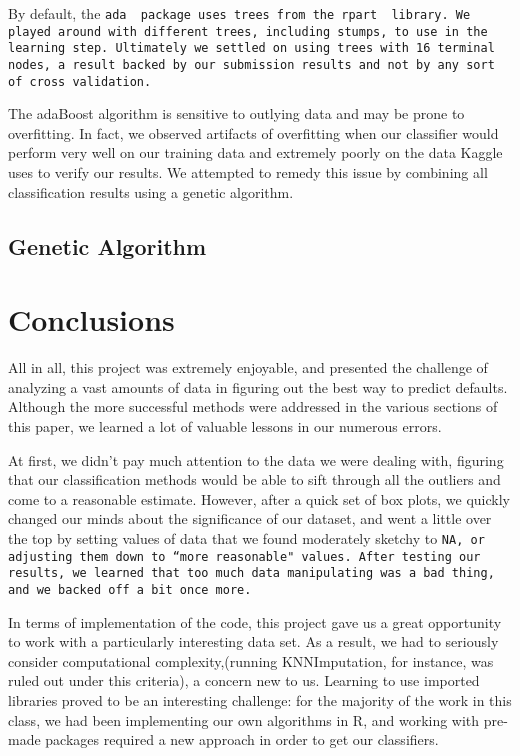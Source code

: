 \documentclass[11pt, oneside]{article}   	%
\begin{document}
	 By default, the \tt ada\rm~ package uses trees from the \tt rpart
	\rm~library. We played around with different trees, including stumps, to use in the learning step. 	Ultimately we settled
	on using trees with 16 terminal nodes, a result backed by our submission results and not by
	any sort of cross validation.
	
	The adaBoost algorithm is sensitive to outlying data and may be prone to overfitting. In fact,
	we observed artifacts of overfitting when our classifier would perform very well on
	our training data and extremely poorly on the data Kaggle uses to verify our results. 
	We attempted to remedy this issue by combining all classification results using a 
	genetic algorithm.
	\subsection{Genetic Algorithm}
\section{Conclusions}
	All in all, this project was extremely enjoyable, and presented the challenge of analyzing a vast amounts of data in figuring out the best way to predict defaults. Although the more successful methods were addressed in the various sections of this paper, we learned a lot of valuable lessons in our numerous errors.
	
	At first, we didn't pay much attention to the data we were dealing with, figuring that our classification methods would be able to sift through all the outliers and come to a reasonable estimate. However, after a quick set of box plots, we quickly changed our minds about the significance of our dataset, and went a little over the top by setting values of data that we found moderately sketchy to \tt NA\rm, or adjusting them down to ``more reasonable" values. After testing our results, we learned that too much data manipulating was a bad thing, and we backed off a bit once more.
	
	
	In terms of implementation of the code, this project gave us a great opportunity to work with a particularly interesting data set. As a result, we had to seriously consider computational complexity,(running KNNImputation, for instance, was ruled out under this criteria), a concern new to us. Learning to use imported libraries proved to be an interesting challenge: for the majority of the work in this class, we had been implementing our own algorithms in R, and working with pre-made packages required a new approach in order to get our classifiers.
	
\end{document}
